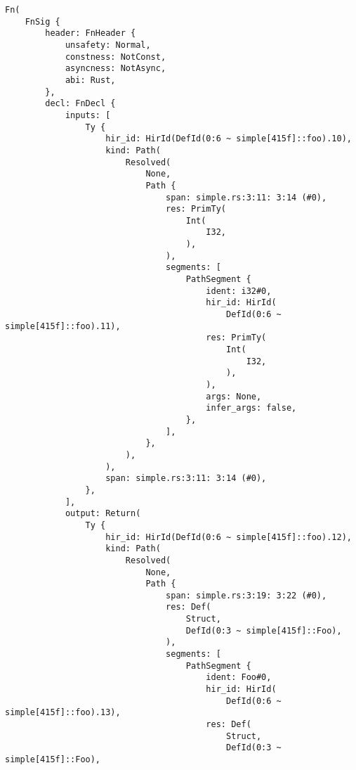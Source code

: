 \documentclass[
  11pt,
  twoside,symmetric]{report}
\begin{document}
\begin{verbatim}
Fn(
    FnSig {
        header: FnHeader {
            unsafety: Normal,
            constness: NotConst,
            asyncness: NotAsync,
            abi: Rust,
        },
        decl: FnDecl {
            inputs: [
                Ty {
                    hir_id: HirId(DefId(0:6 ~ simple[415f]::foo).10),
                    kind: Path(
                        Resolved(
                            None,
                            Path {
                                span: simple.rs:3:11: 3:14 (#0),
                                res: PrimTy(
                                    Int(
                                        I32,
                                    ),
                                ),
                                segments: [
                                    PathSegment {
                                        ident: i32#0,
                                        hir_id: HirId(
                                            DefId(0:6 ~ simple[415f]::foo).11),
                                        res: PrimTy(
                                            Int(
                                                I32,
                                            ),
                                        ),
                                        args: None,
                                        infer_args: false,
                                    },
                                ],
                            },
                        ),
                    ),
                    span: simple.rs:3:11: 3:14 (#0),
                },
            ],
            output: Return(
                Ty {
                    hir_id: HirId(DefId(0:6 ~ simple[415f]::foo).12),
                    kind: Path(
                        Resolved(
                            None,
                            Path {
                                span: simple.rs:3:19: 3:22 (#0),
                                res: Def(
                                    Struct,
                                    DefId(0:3 ~ simple[415f]::Foo),
                                ),
                                segments: [
                                    PathSegment {
                                        ident: Foo#0,
                                        hir_id: HirId(
                                            DefId(0:6 ~ simple[415f]::foo).13),
                                        res: Def(
                                            Struct,
                                            DefId(0:3 ~ simple[415f]::Foo),

\end{verbatim}
\end{document}
